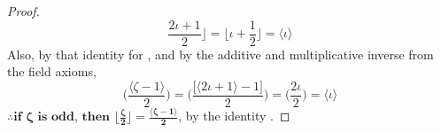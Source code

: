 \documentclass[preview]{standalone}
\begin{document}
\begin{proof}
\begin{equation*}
            \frac{2 \iota + 1}{2}
        \bigg \rfloor 
            = 
        \bigg \lfloor
            \iota + \frac{1}{2}
        \bigg \rfloor 
            = 
        \Big \langle \iota \Big \rangle
    \end{equation*}
    Also, by that identity for \bm{$\zeta$},
    and by the additive and multiplicative inverse from the field axioms,
    \begin{equation*}
        \Bigg( \frac{\big \langle \zeta - 1 \big \rangle }{2} \Bigg)
            = 
        \Bigg( \frac{\big[ \big \langle 2 \iota + 1 \big \rangle - 1 \big]}{2} \Bigg)
            = 
        \Bigg( \frac{2 \iota}{2} \Bigg)
            = 
        \Big \langle \iota \Big \rangle
    \end{equation*} 
    $\therefore \textbf{if } \bm{\zeta} \textbf{ is odd, then } 
    \bm{
        \Big \lfloor \frac{\zeta}{2} \Big \rfloor 
            = 
        \frac{ \langle \zeta - 1 \rangle }{2}
    }$, 
    by the identity \bm{$\iota$}.
\end{proof}
\end{document}
